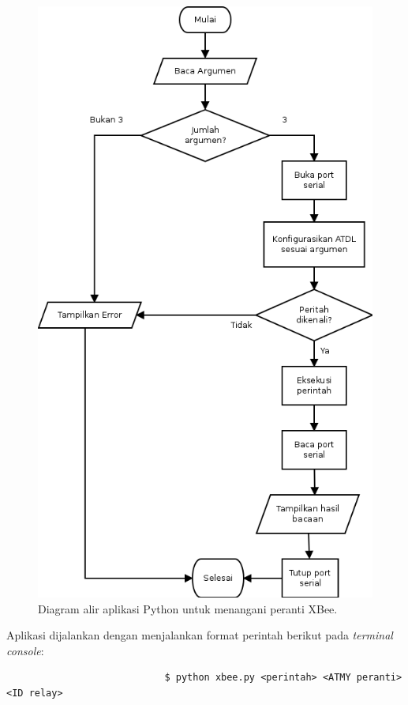 \begin{enumerate}
					\begin{figure}[ht!]
					  \centering
					    \includegraphics{gambar/python-xbee}
					    \caption{Diagram alir aplikasi Python untuk menangani peranti XBee.}
					    \label{python-xbee}
					\end{figure}

					Aplikasi dijalankan dengan menjalankan format perintah berikut pada \emph{terminal console}:
					\begingroup
					    \fontsize{10pt}{12pt}\selectfont
					    \begin{verbatim}
					    	$ python xbee.py <perintah> <ATMY peranti> <ID relay>
					    \end{verbatim}  
					\endgroup


\end{enumerate}

